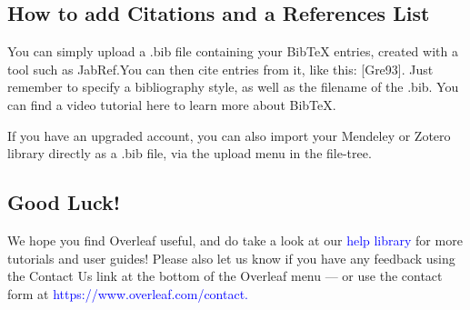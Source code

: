 \documentclass{article}
\begin{document}
	\subsection{How to add Citations and a References List}
	You can simply upload a .bib file containing your BibTeX entries, created with a tool such as JabRef.You can then cite entries from it, like this: [Gre93]. Just remember to specify a bibliography style, as well as the filename of the .bib. You can find a video tutorial here to learn more about BibTeX. 
	\par{}If you have an upgraded account, you can also import your Mendeley or Zotero library directly as a .bib file, via the upload menu in the file-tree.
	
	\subsection{Good Luck!}
	We hope you find Overleaf useful, and do take a look at our \textcolor{blue}{help library }for more tutorials and user guides! Please also let us know if you have any feedback using the Contact Us link at the bottom of the Overleaf menu — or use the contact form at \textcolor{blue}{https://www.overleaf.com/contact.}
	\cite{Gre93}
	
	
\end{document}

